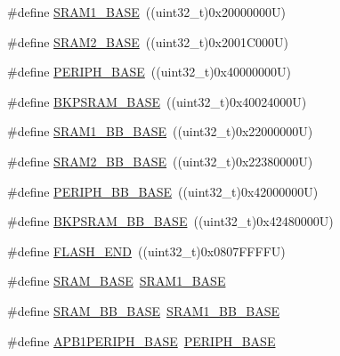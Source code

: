 \begin{DoxyCompactItemize}
\item 
\#define \hyperlink{group___peripheral__registers__structures_ga7d0fbfb8894012dbbb96754b95e562cd}{S\+R\+A\+M1\+\_\+\+B\+A\+SE}~((uint32\+\_\+t)0x20000000\+U)
\item 
\#define \hyperlink{group___peripheral__registers__structures_gadbb42a3d0a8a90a79d2146e4014241b1}{S\+R\+A\+M2\+\_\+\+B\+A\+SE}~((uint32\+\_\+t)0x2001\+C000\+U)
\item 
\#define \hyperlink{group___peripheral__registers__structures_ga9171f49478fa86d932f89e78e73b88b0}{P\+E\+R\+I\+P\+H\+\_\+\+B\+A\+SE}~((uint32\+\_\+t)0x40000000\+U)
\item 
\#define \hyperlink{group___peripheral__registers__structures_ga52e57051bdf8909222b36e5408a48f32}{B\+K\+P\+S\+R\+A\+M\+\_\+\+B\+A\+SE}~((uint32\+\_\+t)0x40024000\+U)
\item 
\#define \hyperlink{group___peripheral__registers__structures_gac4c4f61082e4b168f29d9cf97dc3ca5c}{S\+R\+A\+M1\+\_\+\+B\+B\+\_\+\+B\+A\+SE}~((uint32\+\_\+t)0x22000000\+U)
\item 
\#define \hyperlink{group___peripheral__registers__structures_gac33cb6edadf184ab9860d77089503922}{S\+R\+A\+M2\+\_\+\+B\+B\+\_\+\+B\+A\+SE}~((uint32\+\_\+t)0x22380000\+U)
\item 
\#define \hyperlink{group___peripheral__registers__structures_gaed7efc100877000845c236ccdc9e144a}{P\+E\+R\+I\+P\+H\+\_\+\+B\+B\+\_\+\+B\+A\+SE}~((uint32\+\_\+t)0x42000000\+U)
\item 
\#define \hyperlink{group___peripheral__registers__structures_gaee19a30c9fa326bb10b547e4eaf4e250}{B\+K\+P\+S\+R\+A\+M\+\_\+\+B\+B\+\_\+\+B\+A\+SE}~((uint32\+\_\+t)0x42480000\+U)
\item 
\#define \hyperlink{group___peripheral__registers__structures_ga8be554f354e5aa65370f6db63d4f3ee4}{F\+L\+A\+S\+H\+\_\+\+E\+ND}~((uint32\+\_\+t)0x0807\+F\+F\+F\+F\+U)
\item 
\#define \hyperlink{group___peripheral__registers__structures_ga05e8f3d2e5868754a7cd88614955aecc}{S\+R\+A\+M\+\_\+\+B\+A\+SE}~\hyperlink{group___peripheral__memory__map_ga7d0fbfb8894012dbbb96754b95e562cd}{S\+R\+A\+M1\+\_\+\+B\+A\+SE}
\item 
\#define \hyperlink{group___peripheral__registers__structures_gad3548b6e2f017f39d399358f3ac98454}{S\+R\+A\+M\+\_\+\+B\+B\+\_\+\+B\+A\+SE}~\hyperlink{group___peripheral__memory__map_gac4c4f61082e4b168f29d9cf97dc3ca5c}{S\+R\+A\+M1\+\_\+\+B\+B\+\_\+\+B\+A\+SE}
\item 
\#define \hyperlink{group___peripheral__registers__structures_ga45666d911f39addd4c8c0a0ac3388cfb}{A\+P\+B1\+P\+E\+R\+I\+P\+H\+\_\+\+B\+A\+SE}~\hyperlink{group___peripheral__memory__map_ga9171f49478fa86d932f89e78e73b88b0}{P\+E\+R\+I\+P\+H\+\_\+\+B\+A\+SE}

\end{DoxyCompactItemize}
